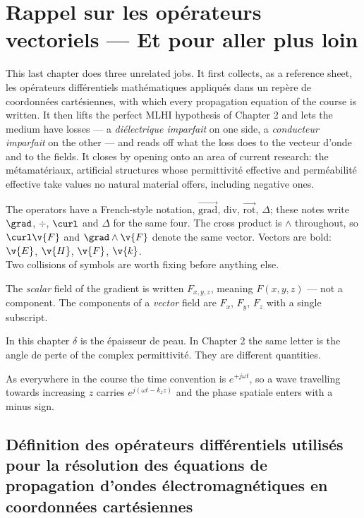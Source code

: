 \section{Rappel sur les opérateurs vectoriels --- Et pour aller plus loin}
This last chapter does three unrelated jobs. It first collects, as a
reference sheet, les opérateurs différentiels mathématiques appliqués dans un
repère de coordonnées cartésiennes, with which every propagation equation of the
course is written. It then lifts the perfect MLHI hypothesis of Chapter 2 and
lets the medium have losses --- a \textit{diélectrique imparfait} on one side, a
\textit{conducteur imparfait} on the other --- and reads off what the loss does
to the vecteur d'onde and to the fields. It closes by opening onto an area of
current research: the métamatériaux, artificial structures whose permittivité
effective and perméabilité effective take values no natural material offers,
including negative ones.

\begin{notation}
  The operators have a French-style notation,
  $\overrightarrow{\mathrm{grad}}$, $\mathrm{div}$,
  $\overrightarrow{\mathrm{rot}}$, $\Delta$; these notes write $\grad$, $\div$,
  $\curl$ and $\Delta$ for the same four. The cross product is $\wedge$
  throughout, so $\curl\v{F}$ and $\grad\wedge\v{F}$ denote
  the same vector. Vectors are bold: $\v{E}$, $\v{H}$, $\v{F}$, $\v{k}$.\\

  Two collisions of symbols are worth fixing before anything else.
  \begin{subpart}
    \item The \emph{scalar} field of the gradient is written
      $F_{x,y,z}$, meaning $F(x,y,z)$ --- not a component. The components of a
      \emph{vector} field are $F_x$, $F_y$, $F_z$ with a single subscript.
    \item In this chapter $\delta$ is the épaisseur de peau. In Chapter 2 the
      same letter is the angle de perte of the complex permittivité. They are
      different quantities.
  \end{subpart}
  As everywhere in the course the time convention is $e^{+j\omega t}$, so a
  wave travelling towards increasing $z$ carries $e^{j(\omega t - k_z z)}$ and
  the phase spatiale enters with a minus sign.
\end{notation}

\subsection{Définition des opérateurs différentiels utilisés pour la résolution des équations de propagation d'ondes électromagnétiques en coordonnées cartésiennes}

